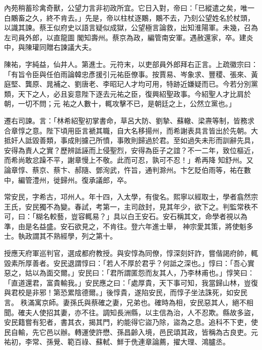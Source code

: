 \begin{pinyinscope}
 內苑稍蓄珍禽奇獸，公望力言非初政所宜。它日入對，帝曰：「已縱遣之矣，唯一白鷴畜之久，終不肯去。」先是，帝以柱杖逐鷴，鷴不去，乃刻公望姓名於杖頭，以識其諫。蔡王似府史以語言疑似成獄，公望極言論救，出知淮陽軍。未幾，召為左司員外郎，以直龍圖
 閣知壽州。蔡京為政，編管南安軍。遇赦還家，卒。建炎中，與陳瓘同贈右諫議大夫。



 陳祐，字純益，仙井人。第進士。元符末，以吏部員外郎拜右正言。上疏徽宗曰：「有旨令臣與任伯雨論韓忠彥援引元祐臣僚事。按賈易、岑象求、豐稷、張來、黃庭堅、龔原、晁補之、劉唐老、李昭玘人才均可用，特跡近嫌疑而已。今若分別黨類，天下之人，必且妄意陛下逐去元祐之臣，復興紹聖政事。今紹聖人才比肩於朝，一切不問；元
 祐之人數十，輒攻擊不已，是朝廷之上，公然立黨也。」



 遷右司諫。言：「林希紹聖初掌書命，草呂大防、劉摯、蘇轍、梁燾等制，皆務求合章惇之意。陛下頃用臣言褫其職，自大名移揚州，而希謝表具言皆出於先朝。大抵奸人詆毀善類，事成則攄己所憤，事敗則歸過於君。至如過失未形而訓辭先具，安得為責人之實？歷辨詆誣而上侵聖烈，安得為臣子之誼？不一二年，致位樞近，而希尚敢忿躁不平，謝章慢上不敬。此而可忍，孰可不忍！」希再降
 知舒州。又論章惇、蔡京、蔡卞、郝隨、鄧洵武，忤旨，通判滁州。卞乞貶伯雨等，祐在數中，編管澧州，徙歸州。復承議郎，卒。



 常安民，字希古，邛州人。年十四，入太學，有俊名。熙寧以經取士，學者翕然宗王氏，安民獨不為變。春試，考第一，主司啟封，見其年少，欲下之。判監常秩不可，曰：「糊名較藝，豈容輒易？」具以白王安石。安石稱其文，命學者視以為準，由是名益盛。安石欲見之，不肯往。登六年進士舉，
 神宗愛其策，將使魁多士。執政謂其不熟經學，列之第十。



 授應天府軍巡判官，選成都府教授。與安惇為同僚，惇深刻奸詐，嘗偕謁府帥，輒毀素所厚善者。安民退謂惇曰：「若人不厚於君乎？何詆之深也。」惇曰：「吾心實惡之，姑以為面交爾。」安民曰：「君所謂匿怨而友其人，乃李林甫也。」惇笑曰：「直道還君，富貴輸我。」安民應之曰：「處厚貴，天下事可知，我當歸山林，豈復與君校是非邪！第恐累陰德爾。」後惇貴，遂陷安民，而惇子坐法誅死，如安民言。
 秩滿寓京師。妻孫氏與蔡確之妻，兄弟也。確時為相，安民惡其人，絕不相聞。確夫人使招其妻，亦不往。調知長洲縣，以主信為治，人不忍欺。縣故多盜，安民籍嘗有犯者，書其衣，揭其門，約能得它盜乃除，盜為之息。追科不下吏，使民自輸，先它邑以辦。轉運使許懋、孫昌齡入境，邑民頌其政，皆稱為古良吏。元祐初，李常、孫覺、範百祿、蘇軾、鮮于侁連章論薦，擢大理、鴻臚丞。




\end{pinyinscope}
